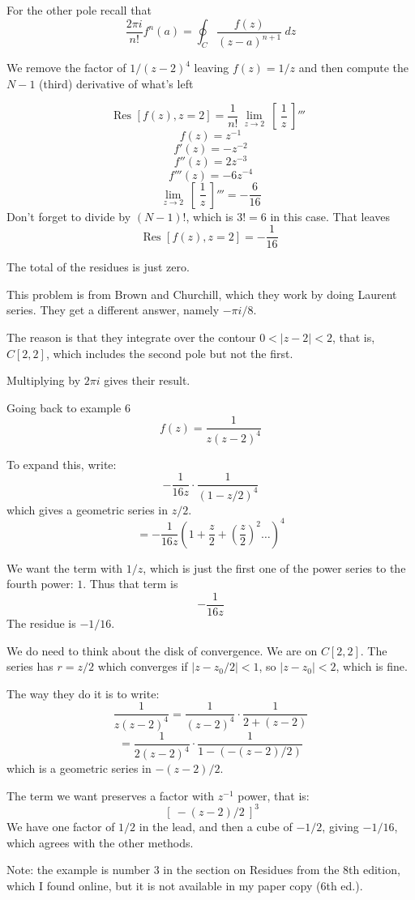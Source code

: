 \documentclass[11pt, oneside]{article}
\begin{document}
For the other pole recall that
\[ \frac{2 \pi i}{n!} f^n(a) = \oint_C \frac{f(z)}{(z-a)^{n+1}} \ dz \]

We remove the factor of $1/(z-2)^4$ leaving $f(z) = 1/z$ and then compute the $N-1$ (third) derivative of what's left

\[ \text{Res } [f(z),z=2] = \frac{1}{n!} \ \lim_{z \rightarrow 2} \ [ \ \frac{1}{z} \ ]''' \ \]
\[ f(z) = z^{-1} \]
\[ f'(z) = - z^{-2} \]
\[ f''(z) = 2 z^{-3} \]
\[ f'''(z) = -6 z^{-4} \]
\[  \lim_{z \rightarrow 2} \ [ \ \frac{1}{z} \ ]''' = - \frac{6}{16} \]
Don't forget to divide by $(N-1)!$, which is $3! = 6$ in this case.  That leaves
\[ \text{Res } [f(z),z=2] = - \frac{1}{16} \]

The total of the residues is just zero.  

This problem is from Brown and Churchill, which they work by doing Laurent series.  They get a different answer, namely $-\pi i/8$.  

The reason is that they integrate over the contour $0 < | z - 2 | < 2$, that is, $C[2,2]$, which includes the second pole but not the first.  

Multiplying by $2 \pi i$ gives their result.

Going back to example 6
\[ f(z) = \frac{1}{z(z-2)^4} \]

To expand this, write:
\[ -\frac{1}{16z} \cdot \frac{1}{(1 - z/2)^4} \]
which gives a geometric series in $z/2$.  
\[ = -\frac{1}{16z} (1 + \frac{z}{2} + (\frac{z}{2})^2 \dots)^4 \]

We want the term with $1/z$, which is just the first one of the power series to the fourth power:  $1$.  Thus that term is
\[   -\frac{1}{16z}  \]
The residue is $-1/16$.

We do need to think about the disk of convergence.  We are on $C[2,2]$.  The series has $r = z/2$ which converges if $|z - z_0/2| < 1$, so $|z - z_0| < 2$, which is fine.

The way they do it is to write:
\[ \frac{1}{z(z - 2)^4} = \frac{1}{(z-2)^4} \cdot \frac{1}{2 + (z - 2)} \]
\[ =  \frac{1}{2(z-2)^4} \cdot \frac{1}{1 - (-(z - 2)/2)} \]
which is a geometric series in $-(z-2)/2$.

The term we want preserves a factor with $z^{-1}$ power, that is:
\[ \ [ \ -(z-2)/2 \ ]^3 \]
We have one factor of $1/2$ in the lead, and then a cube of $-1/2$, giving $-1/16$, which agrees with the other methods.

Note:  the example is number 3 in the section on Residues from the 8th edition, which I found online, but it is not available in my paper copy (6th ed.).
\end{document}
